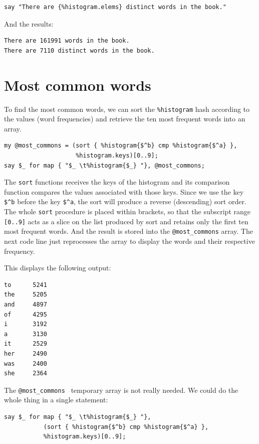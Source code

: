 \begin{verbatim}
say "There are {%histogram.elems} distinct words in the book."
\end{verbatim}
%
And the results:

\begin{verbatim}
There are 161991 words in the book.
There are 7110 distinct words in the book.
\end{verbatim}
%


\section{Most common words}
\label{most_common_words}

To find the most common words, we can sort the \verb'%histogram' 
hash according to the values (word frequencies) and retrieve the
ten most frequent words into an array.

\begin{verbatim}
my @most_commons = (sort { %histogram{$^b} cmp %histogram{$^a} }, 
                    %histogram.keys)[0..9];
say $_ for map { "$_ \t%histogram{$_} "}, @most_commons;
\end{verbatim}

The {\tt sort} functions receives the keys of the histogram and 
its comparison function compares the values associated with 
those keys. Since we use the key \verb'$^b' before the key 
\verb'$^a', the sort will produce a reverse (descending) sort 
order. The whole {\tt sort} procedure is placed within brackets, 
so that the subscript range {\tt [0..9]} acts as a slice on 
the list produced by sort and retains only the first ten most 
frequent words. And the result is stored into the 
\verb'@most_commons' array. The next code line just reprocesses 
the array to display the words and their respective frequency.

This displays the following output:

\begin{verbatim}
to      5241
the     5205
and     4897
of      4295
i       3192
a       3130
it      2529
her     2490
was     2400
she     2364
\end{verbatim}
%

The \verb'@most_commons ' temporary array is not really needed. 
We could do the whole thing in a single statement:

\begin{verbatim}
say $_ for map { "$_ \t%histogram{$_} "},  
           (sort { %histogram{$^b} cmp %histogram{$^a} }, 
           %histogram.keys)[0..9];
\end{verbatim}

